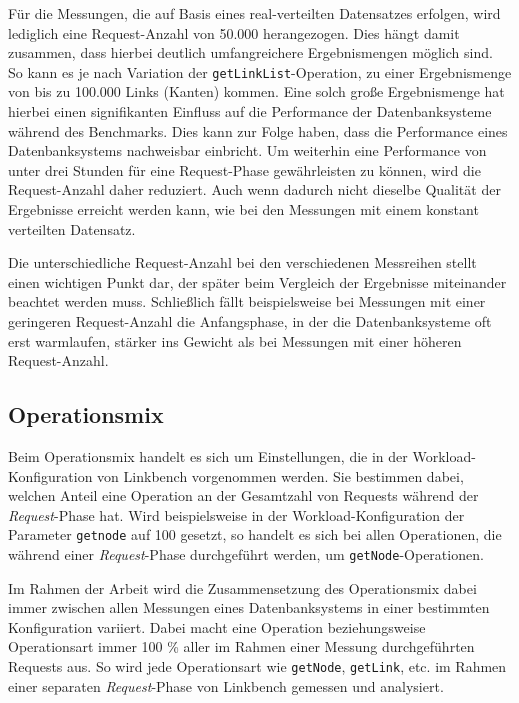 Für die Messungen, die auf Basis eines real-verteilten Datensatzes erfolgen, wird lediglich eine Request-Anzahl von 50.000 herangezogen. Dies hängt damit zusammen, dass hierbei deutlich umfangreichere Ergebnismengen möglich sind. So kann es je nach Variation der \texttt{getLinkList}-Operation, zu einer Ergebnismenge von bis zu 100.000 Links (Kanten) kommen. Eine solch große Ergebnismenge hat hierbei einen signifikanten Einfluss auf die Performance der Datenbanksysteme während des Benchmarks. Dies kann zur Folge haben, dass die Performance eines Datenbanksystems nachweisbar einbricht. Um weiterhin eine Performance von unter drei Stunden für eine Request-Phase gewährleisten zu können, wird die Request-Anzahl daher reduziert. Auch wenn dadurch nicht dieselbe Qualität der Ergebnisse erreicht werden kann, wie bei den Messungen mit einem konstant verteilten Datensatz.

Die unterschiedliche Request-Anzahl bei den verschiedenen Messreihen stellt einen wichtigen Punkt dar, der später beim Vergleich der Ergebnisse miteinander beachtet werden muss. Schließlich fällt beispielsweise bei Messungen mit einer geringeren Request-Anzahl die Anfangsphase, in der die Datenbanksysteme oft erst warmlaufen, stärker ins Gewicht als bei Messungen mit einer höheren Request-Anzahl.

\subsection{Operationsmix}
\label{analyse:linkbench:operationsmix}
Beim Operationsmix handelt es sich um Einstellungen, die in der Workload-Konfiguration von Linkbench vorgenommen werden. Sie bestimmen dabei, welchen Anteil eine Operation an der Gesamtzahl von Requests während der \textit{Request}-Phase hat. Wird beispielsweise in der Workload-Konfiguration der Parameter \texttt{getnode} auf 100 gesetzt, so handelt es sich bei allen Operationen, die während einer \textit{Request}-Phase durchgeführt werden, um \texttt{getNode}-Operationen.

Im Rahmen der Arbeit wird die Zusammensetzung des Operationsmix dabei immer zwischen allen Messungen eines Datenbanksystems in einer bestimmten Konfiguration variiert. Dabei macht eine Operation beziehungsweise Operationsart immer 100 \% aller im Rahmen einer Messung durchgeführten Requests aus. So wird jede Operationsart wie \texttt{getNode}, \texttt{getLink}, etc. im Rahmen einer separaten \textit{Request}-Phase von Linkbench gemessen und analysiert.

